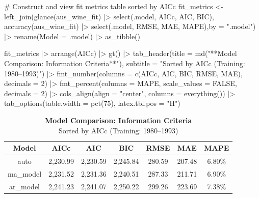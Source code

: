 \documentclass[
  letterpaper,
  DIV=11,
  numbers=noendperiod]{scrartcl}
\newenvironment{Shaded}{\begin{snugshade}}{\end{snugshade}}
\newcommand{\AttributeTok}[1]{\textcolor[rgb]{0.40,0.45,0.13}{#1}}
\newcommand{\CommentTok}[1]{\textcolor[rgb]{0.37,0.37,0.37}{#1}}
\newcommand{\ConstantTok}[1]{\textcolor[rgb]{0.56,0.35,0.01}{#1}}
\newcommand{\DecValTok}[1]{\textcolor[rgb]{0.68,0.00,0.00}{#1}}
\newcommand{\FunctionTok}[1]{\textcolor[rgb]{0.28,0.35,0.67}{#1}}
\newcommand{\NormalTok}[1]{\textcolor[rgb]{0.00,0.23,0.31}{#1}}
\newcommand{\OtherTok}[1]{\textcolor[rgb]{0.00,0.23,0.31}{#1}}
\newcommand{\SpecialCharTok}[1]{\textcolor[rgb]{0.37,0.37,0.37}{#1}}
\newcommand{\StringTok}[1]{\textcolor[rgb]{0.13,0.47,0.30}{#1}}
\begin{document}
\begin{Shaded}
\begin{Highlighting}[]
\CommentTok{\# Construct and view fit metrics table sorted by AICc}
\NormalTok{fit\_metrics }\OtherTok{\textless{}{-}} \FunctionTok{left\_join}\NormalTok{(}\FunctionTok{glance}\NormalTok{(aus\_wine\_fit) }\SpecialCharTok{|\textgreater{}}
  \FunctionTok{select}\NormalTok{(.model, AICc, AIC, BIC), }\FunctionTok{accuracy}\NormalTok{(aus\_wine\_fit) }\SpecialCharTok{|\textgreater{}}
  \FunctionTok{select}\NormalTok{(.model, RMSE, MAE, MAPE),}\AttributeTok{by =} \StringTok{".model"}\NormalTok{) }\SpecialCharTok{|\textgreater{}}
  \FunctionTok{rename}\NormalTok{(}\AttributeTok{Model =}\NormalTok{ .model) }\SpecialCharTok{|\textgreater{}} \FunctionTok{as\_tibble}\NormalTok{()}

\NormalTok{fit\_metrics }\SpecialCharTok{|\textgreater{}} \FunctionTok{arrange}\NormalTok{(AICc) }\SpecialCharTok{|\textgreater{}} \FunctionTok{gt}\NormalTok{() }\SpecialCharTok{|\textgreater{}}
  \FunctionTok{tab\_header}\NormalTok{(}\AttributeTok{title =} \FunctionTok{md}\NormalTok{(}\StringTok{"**Model Comparison: Information Criteria**"}\NormalTok{),}
             \AttributeTok{subtitle =} \StringTok{"Sorted by AICc (Training: 1980–1993)"}\NormalTok{) }\SpecialCharTok{|\textgreater{}}
  \FunctionTok{fmt\_number}\NormalTok{(}\AttributeTok{columns =} \FunctionTok{c}\NormalTok{(AICc, AIC, BIC, RMSE, MAE), }\AttributeTok{decimals =} \DecValTok{2}\NormalTok{) }\SpecialCharTok{|\textgreater{}}
  \FunctionTok{fmt\_percent}\NormalTok{(}\AttributeTok{columns =}\NormalTok{ MAPE, }\AttributeTok{scale\_values =} \ConstantTok{FALSE}\NormalTok{, }\AttributeTok{decimals =} \DecValTok{2}\NormalTok{) }\SpecialCharTok{|\textgreater{}}
  \FunctionTok{cols\_align}\NormalTok{(}\AttributeTok{align =} \StringTok{"center"}\NormalTok{, }\AttributeTok{columns =} \FunctionTok{everything}\NormalTok{()) }\SpecialCharTok{|\textgreater{}}
  \FunctionTok{tab\_options}\NormalTok{(}\AttributeTok{table.width =} \FunctionTok{pct}\NormalTok{(}\DecValTok{75}\NormalTok{), }\AttributeTok{latex.tbl.pos =} \StringTok{"H"}\NormalTok{)}
\end{Highlighting}
\end{Shaded}

\begin{table}
\caption*{
{\fontsize{20}{25}\selectfont  \textbf{Model Comparison: Information Criteria}\fontsize{12}{15}\selectfont } \\ 
{\fontsize{14}{17}\selectfont  Sorted by AICc (Training: 1980–1993)\fontsize{12}{15}\selectfont }
} 
\fontsize{12.0pt}{14.0pt}\selectfont
\begin{tabular*}{0.75\linewidth}{@{\extracolsep{\fill}}ccccccc}
\toprule
Model & AICc & AIC & BIC & RMSE & MAE & MAPE \\ 
\midrule\addlinespace[2.5pt]
auto & 2,230.99 & 2,230.59 & 2,245.84 & 280.59 & 207.48 & 6.80\% \\ 
ma\_model & 2,231.52 & 2,231.36 & 2,240.51 & 287.33 & 211.71 & 6.90\% \\ 
ar\_model & 2,241.23 & 2,241.07 & 2,250.22 & 299.26 & 223.69 & 7.38\% \\ 
\bottomrule
\end{tabular*}
\end{table}
\end{document}
